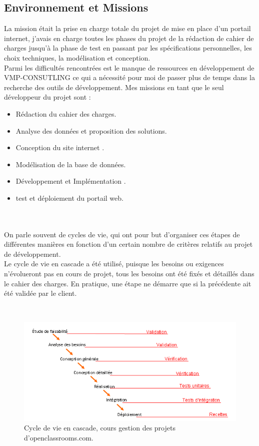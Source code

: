 \documentclass[12pt]{article}
\begin{document}
\subsection{Environnement et Missions}

La mission était la prise en charge totale du projet de mise en place d'un portail internet,
j'avais en charge toutes les phases du projet de la rédaction de cahier de charges jusqu'à la phase de test en 
passant par les spécifications personnelles, les choix techniques, la modélisation et conception.\\
Parmi les difficultés rencontrées est le manque de ressources en développement de VMP-CONSUTLING ce qui a nécessité pour moi 
de passer plus de temps dans la recherche des outils de développement.
Mes missions en tant que le seul développeur du projet sont : \\
\begin{itemize}
\item Rédaction  du cahier des charges.
\item Analyse des données et proposition des solutions.
\item Conception  du site internet .  
\item Modélisation de la base de données.
\item Développement et Implémentation .
\item test et déploiement du portail web.
\end{itemize}
\\ \\
On parle souvent de cycles de vie, qui ont pour but d’organiser ces étapes de différentes manières en fonction d’un certain nombre de critères relatifs au projet de développement.\\
Le cycle de vie en cascade a été utilisé, puisque 
les besoins ou exigences n’évolueront pas en cours de projet, 
tous les besoins ont été fixés et détaillés dans le cahier des charges.
En pratique, une étape ne démarre que si la précédente ait été validée par le client.

\\
\begin{center}
\begin{figure}[htp]
  \centering
  \includegraphics[width=12cm]{p.png}
  \caption{Cycle de vie en cascade, cours gestion des projets d'openclassrooms.com.}
  \label{fig:une-autre-image}
\end{figure}
 
\end{center}
\\ \\
\end{document}

